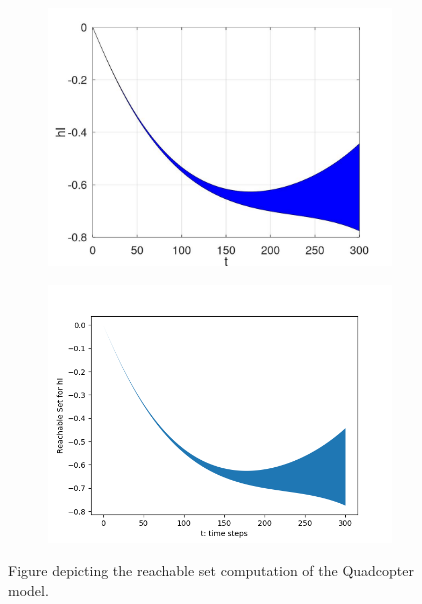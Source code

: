 \documentclass[EPiC]{easychair}
\begin{document}
\begin{figure}[h]
    \begin{subfigure}{0.45\textwidth}
    \centering
    \includegraphics[width=\textwidth]{SapoFigures/Quad/SapoQuad_HI.jpg}
    \end{subfigure}
    \begin{subfigure}{0.47\textwidth}
    \centering
    \includegraphics[width=1.1\textwidth,height=0.85\textwidth]{SapoFigures/Quad/KaaQuad_HI.png}
    \end{subfigure}
    
    \caption{Figure depicting the reachable set computation of the Quadcopter model.} 
    \label{fig3}
\end{figure}
\end{document}
